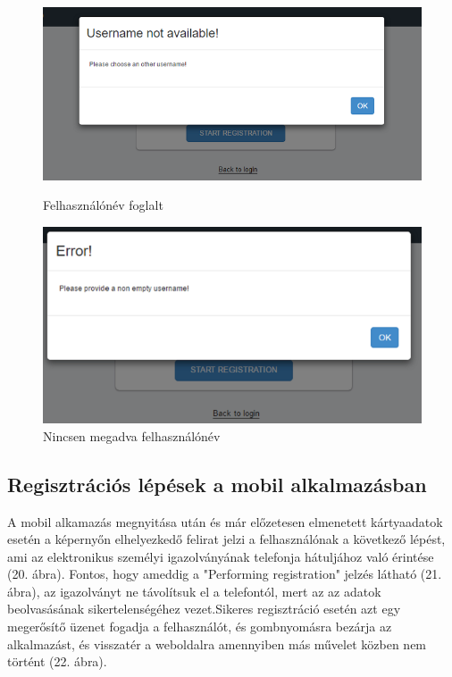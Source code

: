 \begin{figure}[h]
 \begin{minipage}{.50\textwidth} 
\centering
    \includegraphics[scale=0.40]{img/username_not_available}
    \caption{Felhasználónév foglalt}
 \end{minipage}
 \begin{minipage}{.50\textwidth} 
\centering
     \includegraphics[scale=0.40]{img/username_empty}
     \caption{Nincsen megadva felhasználónév}
 \end{minipage}
\end{figure}

\subsection{Regisztrációs lépések a mobil alkalmazásban}
A mobil alkamazás megnyitása után és már előzetesen elmenetett kártyaadatok esetén a képernyőn elhelyezkedő felirat jelzi a felhasználónak a következő lépést, ami az elektronikus személyi igazolványának telefonja hátuljához való érintése (20. ábra). Fontos, hogy ameddig a "Performing registration" jelzés látható (21. ábra), az igazolványt ne távolítsuk el a telefontól, mert az az adatok beolvasásának sikertelenségéhez vezet.Sikeres regisztráció esetén azt egy megerősítő üzenet fogadja a felhasználót, és gombnyomásra bezárja az alkalmazást, és visszatér a weboldalra amennyiben más művelet közben nem történt (22. ábra).

